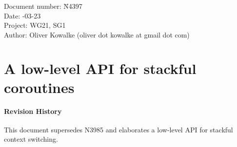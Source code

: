 \documentclass[paper=A4,pagesize,DIV=15]{scrartcl}
\begin{document}
\small
\begin{tabbing}
    Document number: \= N4397\\
    Date:            -03-23\\
    Project:         \> WG21, SG1\\
    Author:          \> Oliver Kowalke (oliver dot kowalke at gmail dot com)\\
\end{tabbing}

\section*{A low-level API for stackful coroutines}


\tableofcontents


\paragraph*{Revision History}
This document supersedes N3985 and elaborates a low-level API for stackful
context switching.













\end{document}
